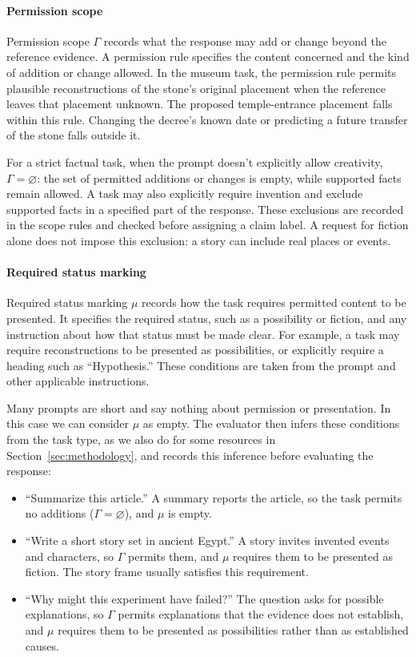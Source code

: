 \documentclass{clv2025}
\begin{document}
\paragraph{Permission scope}
Permission scope $\Gamma$ records what the response may add or change beyond
the reference evidence. A permission rule specifies the content concerned
and the kind of addition or change allowed. In the museum task, the permission rule permits
plausible reconstructions of the stone's original placement when the
reference leaves that placement unknown. The proposed temple-entrance
placement falls within this rule. Changing the decree's known date or
predicting a future transfer of the stone falls outside it.

For a strict factual task, when the prompt doesn't explicitly allow creativity, $\Gamma=\varnothing$: the set of permitted
additions or changes is empty, while supported facts remain allowed.
A task may also explicitly require invention and exclude supported facts
in a specified part of the response. These exclusions are recorded in the
scope rules and checked before assigning a claim label. A request for
fiction alone does not impose this exclusion: a story can include real
places or events.

\paragraph{Required status marking}
Required status marking $\mu$ records how the task requires permitted
content to be presented. It specifies the required status, such as a
possibility or fiction, and any instruction about how that status must be
made clear. For example, a task may require reconstructions to be presented
as possibilities, or explicitly require a heading such as ``Hypothesis.''
These conditions are taken from the prompt and other applicable
instructions.

Many prompts are short and say nothing about permission or presentation. In this case we can consider $\mu$ as empty.
The evaluator then infers these conditions from the task type, as we also
do for some resources in Section~\ref{sec:methodology}, and records this
inference before evaluating the response:
\begin{itemize}
\item ``Summarize this article.'' A summary reports the article, so the
task permits no additions ($\Gamma=\varnothing$), and $\mu$ is empty.
\item ``Write a short story set in ancient Egypt.'' A story invites
invented events and characters, so $\Gamma$ permits them, and $\mu$
requires them to be presented as fiction. The story frame usually satisfies this requirement.
\item ``Why might this experiment have failed?'' The question asks for
possible explanations, so $\Gamma$ permits explanations that the evidence
does not establish, and $\mu$ requires them to be presented as
possibilities rather than as established causes.
\end{itemize}
\end{document}
